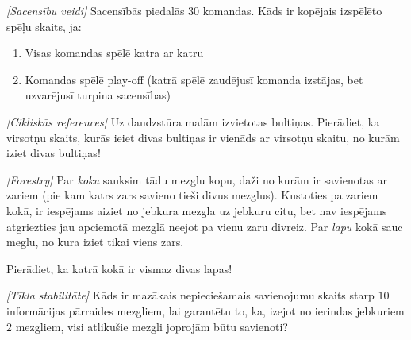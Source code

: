 \begin{problem}
\textit{[Sacensību veidi]}
Sacensībās piedalās $30$ komandas. Kāds ir kopējais izspēlēto spēļu skaits, ja:
\begin{enumerate}
\item Visas komandas spēlē katra ar katru
\item Komandas spēlē play-off (katrā spēlē zaudējusī komanda izstājas, bet uzvarējusī turpina sacensības)
\end{enumerate}
\end{problem}
%

\begin{problem}
\textit{[Cikliskās references]}
Uz daudzstūra malām izvietotas bultiņas. Pierādiet, ka virsotņu skaits, kurās ieiet divas bultiņas ir vienāds ar virsotņu skaitu, no kurām iziet divas bultiņas!
\end{problem}
%

\begin{problem}
\textit{[Forestry]}
Par \textit{koku} sauksim tādu mezglu kopu, daži no kurām ir savienotas ar zariem (pie kam katrs zars savieno tieši divus mezglus). Kustoties pa zariem kokā, ir iespējams aiziet no jebkura mezgla uz jebkuru citu, bet nav iespējams atgriezties jau apciemotā mezglā neejot pa vienu zaru divreiz. Par \textit{lapu} kokā sauc meglu, no kura iziet tikai viens zars. 

Pierādiet, ka katrā kokā ir vismaz divas lapas!

\end{problem}
%

\begin{problem}
\textit{[Tīkla stabilitāte]}
Kāds ir mazākais nepieciešamais savienojumu skaits starp $10$ informācijas pārraides mezgliem, lai garantētu to, ka, izejot no ierindas jebkuriem $2$ mezgliem, visi atlikušie mezgli joprojām būtu savienoti?
\end{problem}
%



